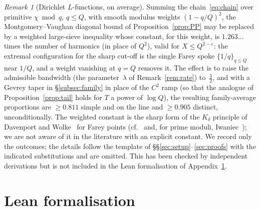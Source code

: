\documentclass[11pt]{amsart}
\theoremstyle{definition}
\theoremstyle{remark}
\newtheorem{remark}[theorem]{Remark}
\numberwithin{equation}{section}
\newcommand{\eps}{\varepsilon}
\begin{document}
\begin{remark}[Dirichlet $L$-functions, on average]\label{rem:Davg}
Summing the chain~\eqref{eq:chain} over primitive $\chi\bmod q$, $q\le Q$, with smooth modulus weights $(1-q/Q)^2$, the Montgomery--Vaughan diagonal bound of Proposition~\ref{prop:PP} may be replaced by a weighted large-sieve inequality whose constant, for this weight, is $1.263\ldots$ times the number of harmonics (in place of $Q^2$), valid for $X\le Q^{2-\eps}$: the extremal configuration for the sharp cut-off is the single Farey spoke $\{1/q\}_{q\le Q}$ near $1/Q$, and a weight vanishing at $q=Q$ removes it. The effect is to raise the admissible bandwidth (the parameter~$\lambda$ of Remark~\ref{rem:rate}) to~$\tfrac32$, and with a Gevrey taper in \S\ref{subsec:family} in place of the $C^2$ ramp (so that the analogue of Proposition~\ref{prop:tail} holds for $T$ a power of $\log Q$), the resulting family-average proportions are $\ge0.811$ simple and on the line and $\ge0.905$ distinct, unconditionally. The weighted constant is the sharp form of the $K_\delta$ principle of Davenport and Wolke~\cite{Wol71} for Farey points (cf.~\cite{Bai06,MV74,Ram09,BZ05} and, for prime moduli, Iwaniec~\cite{Iwa22}); we are not aware of it in the literature with an explicit constant. We record only the outcomes; the details follow the template of \S\S\ref{sec:setup}--\ref{sec:proofs} with the indicated substitutions and are omitted. This has been checked by independent derivations but is not included in the Lean formalisation of Appendix~\ref{app:lean}.
\end{remark}

\appendix
\section{Lean formalisation}\label{app:lean}
\end{document}
